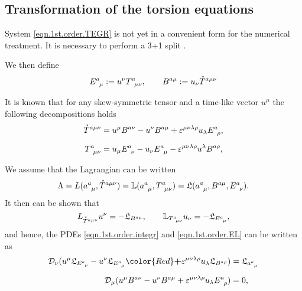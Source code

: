 \documentclass[
10pt, %
a4paper, %
oneside, %
headinclude,footinclude, %
BCOR5mm, %
]{scrartcl}
\newcommand{\tetr}[2]{a^{#1}_{\phantom{#1}#2}}
\newcommand{\D}[1]{\mathcal{D}_{#1}} %
\newcommand{\Tors}[2]{T^{#1}_{\phantom{a}#2}}
\newcommand{\ET}[2]{E^{#1}_{\phantom{#1}#2}}	%
\newcommand{\BT}[2]{B^{#1#2}}	%
\newcommand{\Laghodge}{L}%
\newcommand{\Lagtors}{\mathbb{L}}%
\newcommand{\LagBE}{\mathfrak{L}}%
\newcommand{\veps}{\varepsilon}
\newcommand{\HT}[1]{\accentset{\star}{T}^{#1}}
\begin{document}
\subsection{Transformation of the torsion equations}\label{sec.transform.potential}


System \eqref{eqn.1st.order.TEGR} is not yet in a convenient form for the numerical treatment. It 
is necessary to perform a 3+1 split \cite{Alcubierre2008}. 


We then define 
\begin{equation}
\ET{a}{\mu} := u^\nu \Tors{a}{\mu\nu}, \qquad  \BT{a}{\mu} := u_\nu\HT{a\mu\nu}
\end{equation}

It is known that for any skew-symmetric tensor and a time-like vector $ u^\mu $ the following 
decompositions holds
\begin{subequations}\label{eqn.T.decompos}
\begin{align}
\HT{a\mu\nu} &= u^\mu \BT{a}{\nu} - u^\nu \BT{a}{\mu} + \veps^{\mu\nu\lambda\rho}u_\lambda 
\ET{a}{\rho},\\[2mm]
\Tors{a}{\mu\nu} &= u_\mu \ET{a}{\nu} - u_\nu \ET{a}{\mu} - \veps^{\mu\nu\lambda\rho}u^\lambda 
\BT{a}{\rho},
\end{align}
\end{subequations}

We assume that the Lagrangian can be written 
\begin{equation}
\Lambda = \Laghodge(\tetr{a}{\mu},\HT{a\mu\nu}) = \Lagtors(\tetr{a}{\mu},\Tors{a}{\mu\nu}) = 
\LagBE(\tetr{a}{\mu},\BT{a}{\mu},\ET{a}{\nu}).
\end{equation}
It then can be shown that 
\begin{equation}
\Laghodge_{\HT{a\mu\nu}}u^\nu = -\LagBE_{\BT{a}{\mu}}, \qquad \Lagtors_{\Tors{a}{\mu\nu}}u_\nu = 
-\LagBE_{\ET{a}{\mu}},
\end{equation}
and hence, the PDEs \eqref{eqn.1st.order.integr} and \eqref{eqn.1st.order.EL} can be written as 
\begin{subequations}\label{eqn.tors.BE}
	\begin{align}
		\D{\nu}(u^\mu \LagBE_{\ET{a}{\nu}} - u^\nu\LagBE_{\ET{a}{\mu}} {\color{Red}\bm{+}} 
		\veps^{\mu\nu\lambda\rho}u_\lambda\LagBE_{\BT{a}{\rho}}) &=\LagBE_{\tetr{a}{\mu}}
		\\[2mm]
		\D{\mu}(u^\mu \BT{a}{\nu} - u^\nu\BT{a}{\mu} + 
		\veps^{\mu\nu\lambda\rho}u_\lambda\ET{a}{\rho}) &= 0,
	\end{align}
\end{subequations}
\end{document}
